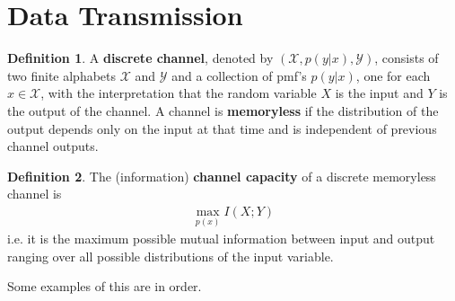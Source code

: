 \documentclass{article}
\theoremstyle{definition}
\newtheorem{definition}{Definition}[section]
\theoremstyle{plain}
\begin{document}
\section{Data Transmission}
\begin{definition}
	A \textbf{discrete channel}, denoted by $(\mathcal{X},p(y|x),\mathcal{Y})$, consists of two finite alphabets $\mathcal{X}$ and $\mathcal{Y}$ and a collection of pmf's $p(y|x)$, one for each $x \in \mathcal{X}$, with the interpretation that the random variable $X$ is the input and $Y$ is the output of the channel. A channel is \textbf{memoryless} if the distribution of the output depends only on the input at that time and is independent of previous channel outputs. 
\end{definition}
\begin{definition}
	The (information) \textbf{channel capacity} of a discrete memoryless channel is 
	\begin{align}
		\max_{p(x)} I(X;Y)
	\end{align}
i.e. it is the maximum possible mutual information between input and output ranging over all possible distributions of the input variable. 
\end{definition}
Some examples of this are in order. 
\end{document}
